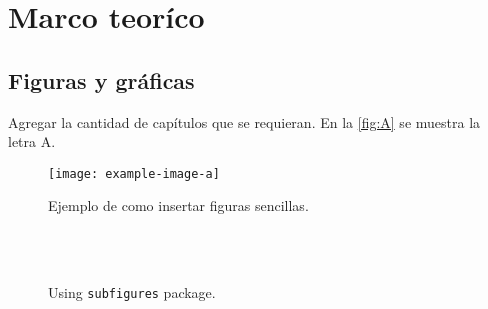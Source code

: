 
\chapter{Marco teoríco} %
\label{ch:MarcoTeorico} 

\section{Figuras y gráficas}
Agregar la cantidad de capítulos que se requieran. En la \autoref{fig:A} se muestra la letra A.


\blindtext[1] %


\begin{figure}[!h]
	\centering
	\texttt{[image: example-image-a]}
	\caption{Ejemplo de como insertar figuras sencillas.}
	\label{fig:A}
\end{figure}

\blindtext[1] %




\begin{figure}[!h]%
\centering
{}%
\\%
%
~ %
%
\caption{Using \texttt{subfigures} package.}
\label{fig:subFigures}
\end{figure}
